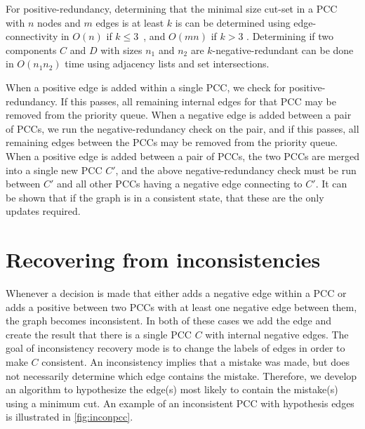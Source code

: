 For positive-redundancy, determining that the minimal size cut-set in a PCC
  with $n$ nodes and $m$ edges is at least $k$ is can be determined using
  edge-connectivity in $O(n)$ if $k \leq 3$~\cite{eswaran_augmentation_1976,wang_simple_2015},
  and $O(mn)$ if $k > 3$ \cite{esfahanian_connectivity_2017}.
Determining if two components $C$ and $D$ with sizes $n_1$ and $n_2$ are
  $k$-negative-redundant can be done in $O(n_1 n_2)$ time using adjacency lists
  and set intersections.

  \kredun{}

When a positive edge is added within a single PCC, we check for positive-redundancy. If this passes, all remaining
internal edges for that PCC may be  removed from the priority queue. When a negative edge is added between a pair of
PCCs, we run the negative-redundancy check on the pair, and if this passes, all remaining edges between the PCCs may be
removed from the priority queue. When a positive edge is added between a pair of PCCs, the two PCCs are merged into a
single new PCC $C'$, and the above negative-redundancy check must be run between $C'$ and all other PCCs having a
negative edge connecting to $C'$. It can be shown that if the graph is in a consistent state, that these are the only
updates required.

\section{Recovering from inconsistencies}\label{sec:incon}
Whenever a decision is made that either adds a negative edge within a PCC or adds a positive between two PCCs with at
least one negative edge between them, the graph becomes inconsistent. In both of these cases we add the edge and create
the result that there is a single PCC $C$ with internal negative edges. The goal of inconsistency recovery mode is to
change the labels of edges in order to make $C$ consistent. An inconsistency implies that a mistake was made, but does
not necessarily determine which edge contains the mistake. Therefore, we develop an algorithm to hypothesize the edge(s)
most likely to contain the mistake(s) using a minimum cut. An example of an inconsistent PCC with hypothesis edges is
illustrated in \cref{fig:inconpcc}.

\inconpcc{}

